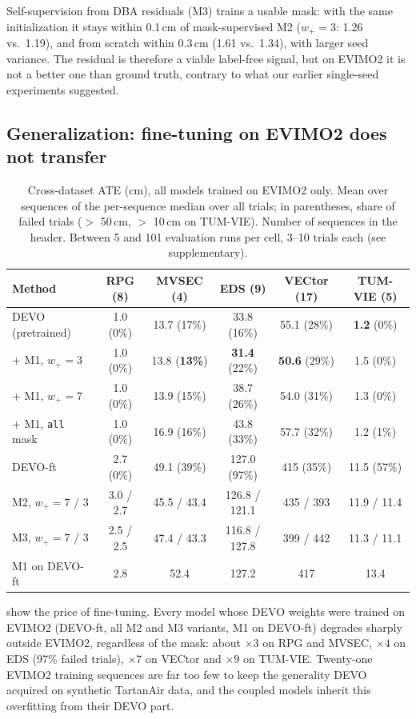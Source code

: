 \documentclass[conference]{IEEEtran}
\newcommand{\best}[1]{\textbf{#1}}
\newcommand{\code}[1]{\texttt{#1}}
\newcommand{\wplus}{w_{+}}
\begin{document}
Self-supervision from DBA residuals (M3) trains a usable mask: with the same
initialization it stays within 0.1\,cm of mask-supervised M2 ($\wplus = 3$: 1.26 vs.\
1.19), and from scratch within 0.3\,cm (1.61 vs.\ 1.34), with larger seed variance. The
residual is therefore a viable label-free signal, but on EVIMO2 it is not a better one than
ground truth, contrary to what our earlier single-seed experiments suggested.

\subsection{Generalization: fine-tuning on EVIMO2 does not transfer}

\begin{table}[t]
\centering
\caption{Cross-dataset ATE (cm), all models trained on EVIMO2 only. Mean over sequences of
the per-sequence median over all trials; in parentheses, share of failed trials
($>$ 50\,cm, $>$ 10\,cm on TUM-VIE). Number of sequences in the header. Between 5 and 101
evaluation runs per cell, 3--10 trials each (see supplementary).}
\label{tab:cross}
\begin{tabular}{lccccc}
\toprule
Method & RPG (8) & MVSEC (4) & EDS (9) & VECtor (17) & TUM-VIE (5) \\
\midrule
DEVO (pretrained) & 1.0 (0\%) & 13.7 (17\%) & 33.8 (16\%) & 55.1 (28\%) & \best{1.2} (0\%) \\
+ M1, $\wplus = 3$ & 1.0 (0\%) & 13.8 (\best{13\%}) & \best{31.4} (22\%) & \best{50.6} (29\%) & 1.5 (0\%) \\
+ M1, $\wplus = 7$ & 1.0 (0\%) & 13.9 (15\%) & 38.7 (26\%) & 54.0 (31\%) & 1.3 (0\%) \\
+ M1, \code{all} mask & 1.0 (0\%) & 16.9 (16\%) & 43.8 (33\%) & 57.7 (32\%) & 1.2 (1\%) \\
\midrule
DEVO-ft & 2.7 (0\%) & 49.1 (39\%) & 127.0 (97\%) & 415 (35\%) & 11.5 (57\%) \\
M2, $\wplus = 7$ / 3 & 3.0 / 2.7 & 45.5 / 43.4 & 126.8 / 121.1 & 435 / 393 & 11.9 / 11.4 \\
M3, $\wplus = 7$ / 3 & 2.5 / 2.5 & 47.4 / 43.3 & 116.8 / 127.8 & 399 / 442 & 11.3 / 11.1 \\
M1 on DEVO-ft & 2.8 & 52.4 & 127.2 & 417 & 13.4 \\
\bottomrule
\end{tabular}
\end{table}

 show the price of fine-tuning. Every model whose DEVO weights
were trained on EVIMO2 (DEVO-ft, all M2 and M3 variants, M1 on DEVO-ft) degrades sharply
outside EVIMO2, regardless of the mask: about $\times 3$ on RPG and MVSEC, $\times 4$ on
EDS (97\% failed trials), $\times 7$ on VECtor and $\times 9$ on TUM-VIE. Twenty-one EVIMO2
training sequences are far too few to keep the generality DEVO acquired on synthetic
TartanAir data, and the coupled models inherit this overfitting from their DEVO part.
\end{document}
